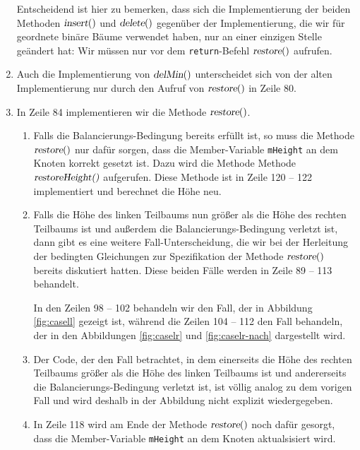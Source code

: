 \begin{enumerate}
      Entscheidend ist hier zu bemerken, dass sich die Implementierung der beiden Methoden
      $\textsl{insert}()$ und $\textsl{delete}()$  gegen\"uber der Implementierung,
      die wir f\"ur geordnete bin\"are B\"aume verwendet haben, nur an einer einzigen Stelle
      ge\"andert hat:  Wir m\"ussen nur vor dem \texttt{return}-Befehl
      $\textsl{restore}()$ aufrufen.
\item Auch die Implementierung von $\textsl{delMin}()$ unterscheidet sich von der alten
      Implementierung nur durch den Aufruf von $\textsl{restore}()$ in Zeile 80.
\item In Zeile 84 implementieren wir die Methode $\textsl{restore}()$.
      \begin{enumerate}
      \item Falls die Balancierungs-Bedingung bereits erf\"ullt ist, so muss die Methode
            $\textsl{restore}()$ nur daf\"ur sorgen, dass die Member-Variable \texttt{mHeight} an dem Knoten
            korrekt gesetzt ist.  Dazu wird die Methode Methode $\textsl{restoreHeight()}$
            aufgerufen.  Diese Methode ist in Zeile 120 -- 122 implementiert und berechnet
            die H\"ohe neu.
      \item Falls die H\"ohe des linken Teilbaums nun gr\"o{\ss}er als die H\"ohe des rechten
            Teilbaums ist und au{\ss}erdem die Balancierungs-Bedingung verletzt ist,
            dann gibt es eine weitere Fall-Unterscheidung, die wir bei der Herleitung
            der bedingten Gleichungen zur Spezifikation der Methode $\textsl{restore}()$
            bereits diskutiert hatten.  Diese beiden F\"alle werden in Zeile 89 -- 113
            behandelt.

            In den Zeilen 98 -- 102 behandeln wir den Fall, der in Abbildung
            \ref{fig:casell} gezeigt ist, w\"ahrend die Zeilen 104 -- 112 
            den Fall behandeln, der in den Abbildungen \ref{fig:caselr} und
            \ref{fig:caselr-nach} dargestellt wird.
      \item Der Code, der den Fall betrachtet, in dem einerseits
            die H\"ohe des rechten Teilbaums  gr\"o{\ss}er als die H\"ohe des linken
            Teilbaums ist und andererseits die Balancierungs-Bedingung verletzt ist,
            ist v\"ollig analog zu dem vorigen Fall und wird deshalb in der Abbildung nicht
            explizit wiedergegeben.
      \item In Zeile 118 wird am Ende der Methode $\textsl{restore}()$ noch daf\"ur gesorgt,
            dass die Member-Variable \texttt{mHeight} an dem Knoten aktualsisiert wird.
      \end{enumerate}
\end{enumerate}


